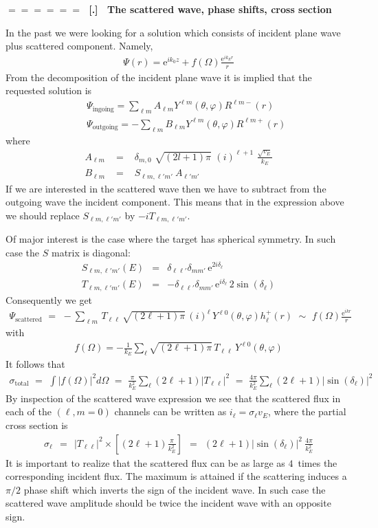\documentclass[onecolumn,fleqn]{revtex4}
\newcommand{\eexp}{\mathrm{e}^}
\newcommand{\tbox}[1]{\text{#1}}
\newcommand{\beq}{\begin{eqnarray}}
\newcommand{\eeq}{\end{eqnarray}}
\renewcommand{\thesubsection}{\arabic{subsection}}
\renewcommand{\thesubsubsection}{\arabic{subsubsection}}
\newcommand{\sheadC}[1]
{
\addtocounter{subsubsection}{1}
\vspace{5mm}
{\Large\bf $=\!=\!=\!=\!=\!=\;$ [\thesubsection.\thesubsubsection] \ #1}  
\nopagebreak
\phantomsection
}
\begin{document}
\sheadC{The scattered wave, phase shifts, cross section}


In the past we were looking for a solution which consists 
of incident plane wave plus scattered component. Namely, 
\beq
\Psi(r) = \eexp{ik_0z} + f(\Omega) \frac{\eexp{ik_E r}}{r}
\eeq
From the decomposition of the incident plane 
wave it is implied that the requested solution is 
\beq
&& \Psi_{\tbox{ingoing}} 
= \sum_{\ell m} A_{\ell m} Y^{\ell m}(\theta,\varphi) R^{\ell m-}(r) 
\\ \nonumber
&& \Psi_{\tbox{outgoing}} 
= -\sum_{\ell m} B_{\ell m} Y^{\ell m}(\theta,\varphi) R^{\ell m+}(r)
\eeq
where
\beq
A_{\ell m} \,\, &=& \,\,  
\delta_{m,0} 
\,\, \sqrt{(2l+1)\pi} 
\,\, (i)^{\ell{+}1} 
\,\, \frac{\sqrt{v_E}}{k_E}
\\ \nonumber
B_{\ell m} \,\, &=& \,\,  
S_{\ell m,\ell' m'} \ A_{\ell' m'} 
\eeq
If we are interested in the scattered wave then 
we have to subtract from the outgoing wave 
the incident component. This means that 
in the expression above we should 
replace $S_{\ell m,\ell' m'}$ by $-iT_{\ell m,\ell' m'}$. 



Of major interest is the case where 
the target has spherical symmetry. 
In such case the $S$ matrix is diagonal: 
\beq
S_{\ell m,\ell' m'}(E) &=& 
\delta_{\ell\ell'}\delta_{mm'} 
\, \eexp{2i\delta_{\ell}}   
\\ \nonumber
T_{\ell m,\ell' m'}(E) &=&
- \delta_{\ell\ell'}\delta_{mm'}
\, \eexp{i\delta_{\ell}} \, 2\sin(\delta_{\ell})    
\eeq
Consequently we get 
\beq
\Psi_{\tbox{scattered}} 
\,\,=\,\, 
-\sum_{\ell m} \, T_{\ell\ell} \, 
\sqrt{(2\ell+1)\pi} \, (i)^{\ell} \, 
Y^{\ell 0}(\theta,\varphi) h_{\ell}^{+}(r)
\,\,\sim\,\, 
f(\Omega) \frac{\eexp{ikr}}{r}
\eeq
with 
\beq
f(\Omega)  = -\frac{1}{k_E} \sum_{\ell} \sqrt{(2\ell+1)\pi} 
\, T_{\ell\ell} \, Y^{\ell 0}(\theta,\varphi) 
\eeq
It follows that 
\beq
\sigma_{\tbox{total}} 
\,\,=\,\, 
\int |f(\Omega)|^2 d\Omega 
\,\,=\,\, 
\frac{\pi}{k_E^2} \sum_{\ell} (2\ell+1) |T_{\ell\ell}|^2   
\,\,=\,\,
\frac{4\pi}{k_E^2} \sum_{\ell} (2\ell+1) |\sin(\delta_{\ell})|^2  
\eeq
By inspection of the scattered wave expression 
we see that the scattered flux 
in each of the ${(\ell, m{=}0)}$ channels 
can be written as ${i_{\ell} = \sigma_{\ell}v_E}$,  
where the partial cross section is  
\beq
\sigma_{\ell} 
\ \ = \ \ 
|T_{\ell\ell}|^2 \times \left[ (2\ell+1) \frac{\pi}{k_E^2} \right] 
\ \ = \ \ 
(2\ell+1) |\sin(\delta_{\ell})|^2 \ \frac{4\pi}{k_E^2} 
\eeq
It is important to realize 
that the scattered flux can be 
as large as $4$~times the corresponding incident flux.
The maximum is attained if the scattering 
induces a $\pi/2$ phase shift which inverts 
the sign of the incident wave. In such case  
the scattered wave amplitude should be twice 
the incident wave with an opposite sign. 
\end{document}
